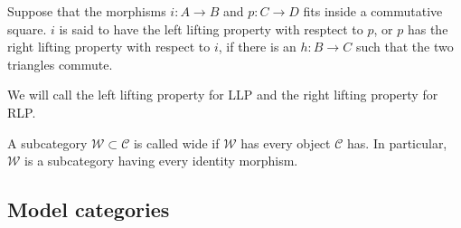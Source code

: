 \documentclass[../thesis.tex]{subfiles}
\begin{document}
        \begin{definition}
            Suppose that the morphisms $i: A \rightarrow B$ and $p: C \rightarrow D$ fits inside a commutative square. $i$ is said to have the left lifting property with resptect to $p$, or $p$ has the right lifting property with respect to $i$, if there is an $h : B \rightarrow C$ such that the two triangles commute.
            \begin{center}
            \end{center}
        \end{definition}

        \begin{remark}
            We will call the left lifting property for LLP and the right lifting property for RLP.
        \end{remark}

        \begin{definition}
            A subcategory $\mathcal{W} \subset \mathcal{C}$ is called wide if $\mathcal{W}$ has every object $\mathcal{C}$ has. In particular, $\mathcal{W}$ is a subcategory having every identity morphism.
        \end{definition}

        \subsection{Model categories}
\end{document}
